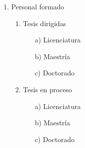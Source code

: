 \documentclass[12pt]{report}
\begin{document}
\begin{enumerate}
\begin{enumerate}
\begin{enumerate}
                        \end{enumerate}

                \item Personal formado
                        \begin{enumerate}
                        \item Tesis dirigidas
                                \begin{itemize}
                                \item[a)] Licenciatura
                                \item[b)] Maestría
                                \item[c)] Doctorado
                                \end{itemize}
                \item Tesis en proceso
                        \begin{itemize}
                                \item[a)] Licenciatura
                                \item[b)] Maestría
                                \item[c)] Doctorado
                                \end{itemize}


\end{enumerate}
\end{enumerate}
\end{enumerate}
\end{document}
